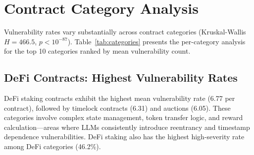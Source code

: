 \section{Contract Category Analysis}
\label{sec:category}

Vulnerability rates vary substantially across contract categories (Kruskal-Wallis $H = 466.5$, $p < 10^{-87}$). Table~\ref{tab:categories} presents the per-category analysis for the top 10 categories ranked by mean vulnerability count.

\begin{table}[t]
\caption{Vulnerability Rates by Contract Category (Top 10, Compiled Only)}
\label{tab:categories}
\centering
{}
\end{table}

\subsection{DeFi Contracts: Highest Vulnerability Rates}

DeFi staking contracts exhibit the highest mean vulnerability rate (6.77 per contract), followed by timelock contracts (6.31) and auctions (6.05). These categories involve complex state management, token transfer logic, and reward calculation---areas where LLMs consistently introduce reentrancy and timestamp dependence vulnerabilities. DeFi staking also has the highest high-severity rate among DeFi categories (46.2\%).

